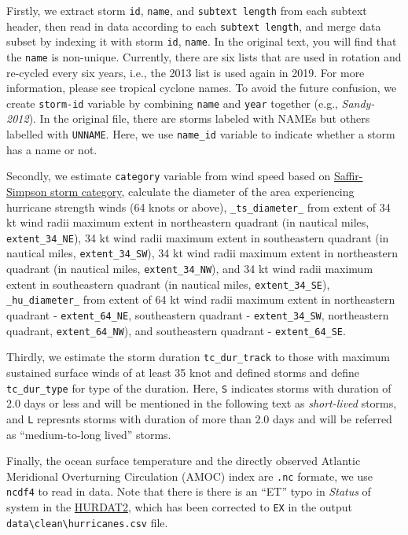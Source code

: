 \documentclass[]{book}
\begin{document}
Firstly, we extract storm \texttt{id}, \texttt{name}, and \texttt{subtext\ length} from each subtext header, then read in data according to each \texttt{subtext\ length}, and merge data subset by indexing it with storm \texttt{id}, \texttt{name}. In the original text, you will find that the \texttt{name} is non-unique. Currently, there are six lists that are used in rotation and re-cycled every six years, i.e., the 2013 list is used again in 2019. For more information, please see tropical cyclone names. To avoid the future confusion, we create \texttt{storm-id} variable by combining \texttt{name} and \texttt{year} together (e.g., \emph{Sandy-2012}). In the original file, there are storms labeled with NAMEs but others labelled with \texttt{UNNAME}. Here, we use \texttt{name\_id} variable to indicate whether a storm has a name or not.

Secondly, we estimate \texttt{category} variable from wind speed based on \href{https://www.nhc.noaa.gov/aboutsshws.php}{Saffir-Simpson storm category}, calculate the diameter of the area experiencing hurricane strength winds (64 knots or above), \texttt{\_ts\_diameter\_} from extent of 34 kt wind radii maximum extent in northeastern quadrant (in nautical miles, \texttt{extent\_34\_NE}), 34 kt wind radii maximum extent in southeastern quadrant (in nautical miles, \texttt{extent\_34\_SW}), 34 kt wind radii maximum extent in northeastern quadrant (in nautical miles, \texttt{extent\_34\_NW}), and 34 kt wind radii maximum extent in southeastern quadrant (in nautical miles, \texttt{extent\_34\_SE}), \texttt{\_hu\_diameter\_} from extent of 64 kt wind radii maximum extent in northeastern quadrant - \texttt{extent\_64\_NE}, southeastern quadrant - \texttt{extent\_34\_SW}, northeastern quadrant, \texttt{extent\_64\_NW}), and southeastern quadrant - \texttt{extent\_64\_SE}.

Thirdly, we estimate the storm duration \texttt{tc\_dur\_track} to those with maximum sustained surface winds of at least 35 knot and defined storms and define \texttt{tc\_dur\_type} for type of the duration. Here, \texttt{S} indicates storms with duration of 2.0 days or less and will be mentioned in the following text as \emph{short-lived} storms, and \texttt{L} represnts storms with duration of more than 2.0 days and will be referred as ``medium-to-long lived'' storms.

Finally, the ocean surface temperature and the directly observed Atlantic Meridional Overturning Circulation (AMOC) index are \texttt{.nc} formate, we use \texttt{ncdf4} to read in data. Note that there is there is an ``ET'' typo in \emph{Status} of system in the \href{https://www.nhc.noaa.gov/data/hurdat/hurdat2-1851-2018-120319.txt}{HURDAT2}, which has been corrected to \texttt{EX} in the output \texttt{data\textbackslash{}clean\textbackslash{}hurricanes.csv} file.
\end{document}
